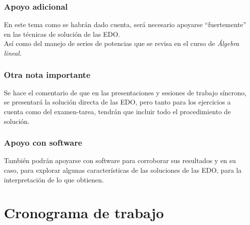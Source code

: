\begin{frame}
\frametitle{Apoyo adicional}
En este tema como se habrán dado cuenta, será necesario apoyarse \enquote{fuertemente} en las técnicas de solución de las EDO.
\\
\bigskip
\pause
Así como del manejo de series de potencias que se revisa en el curso de \emph{Álgebra lineal.}
\end{frame}
\begin{frame}
\frametitle{Otra nota importante}
Se hace el comentario de que en las presentaciones y sesiones de trabajo síncrono, se presentará la solución directa de las EDO, pero tanto para los ejercicios a cuenta como del examen-tarea, tendrán que incluir todo el procedimiento de solución.
\end{frame}
\begin{frame}
\frametitle{Apoyo con software}
También podrán apoyarse con software para corroborar sus resultados y en su caso, para explorar algunas características de las soluciones de las EDO, para la interpretación de lo que obtienen.
\end{frame}
\section{Cronograma de trabajo}
